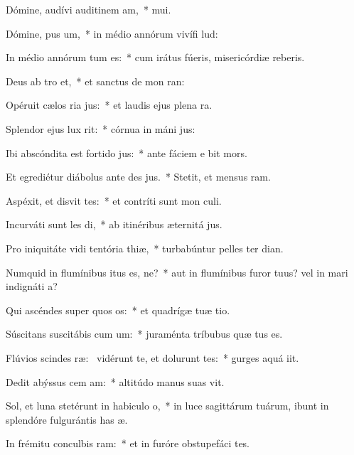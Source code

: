 \item Dómine, audívi auditinem am,~*  mui.
\item Dómine, pus um,~* in médio annórum vivífi lud:
\item In médio annórum tum es:~* cum irátus fúeris, misericórdiæ reberis.
\item Deus ab tro et,~* et sanctus de mon ran:
\item Opéruit cælos ria jus:~* et laudis ejus plena  ra.
\item Splendor ejus  lux rit:~* córnua in máni jus:
\item Ibi abscóndita est fortido jus:~* ante fáciem e bit mors.
\item Et egrediétur diábolus ante des jus.~* Stetit, et mensus  ram.
\item Aspéxit, et disvit tes:~* et contríti sunt mon culi.
\item Incurváti sunt les di,~* ab itinéribus æternitá jus.
\item Pro iniquitáte vidi tentória thiæ,~* turbabúntur pelles ter dian.
\item Numquid in flumínibus itus es, ne?~* aut in flumínibus furor tuus? vel in mari indignáti a?
\item Qui ascéndes super quos os:~* et quadrígæ tuæ tio.
\item Súscitans suscitábis cum um:~* juraménta tríbubus quæ tus es.
\item Flúvios scindes ræ:~\pscross{} vidérunt te, et dolurunt tes:~* gurges aquá iit.
\item Dedit abýssus cem am:~* altitúdo manus suas vit.
\item Sol, et luna stetérunt in habiculo o,~* in luce sagittárum tuárum, ibunt in splendóre fulgurántis has æ.
\item In frémitu conculbis ram:~* et in furóre obstupefáci tes.
